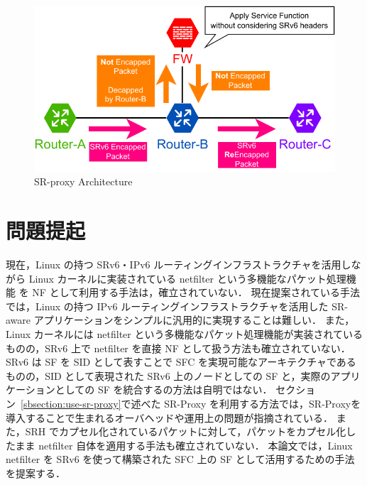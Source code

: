 \begin{figure}[t]
    \centering
    \includegraphics[width=0.95\linewidth]{img/SR-proxy.pdf}
    \caption{SR-proxy Architecture}
    \label{fig:sr-proxy}
\end{figure}

\section{問題提起}
\label{section:prob}
現在，Linux の持つ SRv6・IPv6 ルーティングインフラストラクチャを活用しながら Linux カーネルに実装されている netfilter という多機能なパケット処理機能 を NF として利用する手法は，確立されていない．
現在提案されている手法では，Linux の持つ IPv6 ルーティングインフラストラクチャを活用した SR-aware アプリケーションをシンプルに汎用的に実現することは難しい．
また，Linux カーネルには netfilter という多機能なパケット処理機能が実装されているものの，SRv6 上で netfilter を直接 NF として扱う方法も確立されていない．
SRv6 は SF を SID として表すことで SFC を実現可能なアーキテクチャであるものの，SID として表現された SRv6 上のノードとしての SF と，実際のアプリケーションとしての SF を統合するの方法は自明ではない．
セクション~\ref*{sbsection:use-sr-proxy}で述べた SR-Proxy を利用する方法では，SR-Proxyを導入することで生まれるオーバヘッドや運用上の問題が指摘されている．
また，SRH でカプセル化されているパケットに対して，パケットをカプセル化したまま netfilter 自体を適用する手法も確立されていない．
本論文では，Linux netfilter を SRv6 を使って構築された SFC 上の SF として活用するための手法を提案する．
